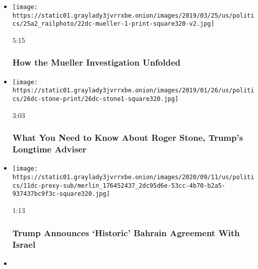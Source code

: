 \begin{itemize}
\item
  \href{https://www.nytimes3xbfgragh.onion/video/us/politics/100000006381390/robert-mueller-report-background.html?action=click\&module=video-series-bar\&region=header\&pgtype=Article\&playlistId=video/us-politics}{}

  \texttt{[image: https://static01.graylady3jvrrxbe.onion/images/2019/03/25/us/politics/25a2\_railphoto/22dc-mueller-1-print-square320-v2.jpg]}

  5:15

  \hypertarget{how-the-mueller-investigation-unfolded}{%
  \subsubsection{How the Mueller Investigation
  Unfolded}\label{how-the-mueller-investigation-unfolded}}
\item
  \href{https://www.nytimes3xbfgragh.onion/video/us/politics/100000006236443/who-is-roger-stone.html?action=click\&module=video-series-bar\&region=header\&pgtype=Article\&playlistId=video/us-politics}{}

  \texttt{[image: https://static01.graylady3jvrrxbe.onion/images/2019/01/26/us/politics/26dc-stone-print/26dc-stone1-square320.jpg]}

  3:03

  \hypertarget{what-you-need-to-know-about-roger-stone-trumps-longtime-adviser}{%
  \subsubsection{What You Need to Know About Roger Stone, Trump's
  Longtime
  Adviser}\label{what-you-need-to-know-about-roger-stone-trumps-longtime-adviser}}
\item
  \href{https://www.nytimes3xbfgragh.onion/video/us/politics/100000007336256/trump-bahrain-israel.html?action=click\&module=video-series-bar\&region=header\&pgtype=Article\&playlistId=video/us-politics}{}

  \texttt{[image: https://static01.graylady3jvrrxbe.onion/images/2020/09/11/us/politics/11dc-prexy-sub/merlin\_176452437\_2dc95d6e-53cc-4b70-b2a5-937437bc9f3c-square320.jpg]}

  1:13

  \hypertarget{trump-announces-historic-bahrain-agreement-with-israel}{%
  \subsubsection{Trump Announces `Historic' Bahrain Agreement With
  Israel}\label{trump-announces-historic-bahrain-agreement-with-israel}}
\item
  \href{https://www.nytimes3xbfgragh.onion/video/us/politics/100000007334631/trump-woodward-coronavirus-interview.html?action=click\&module=video-series-bar\&region=header\&pgtype=Article\&playlistId=video/us-politics}{}


\end{itemize}

